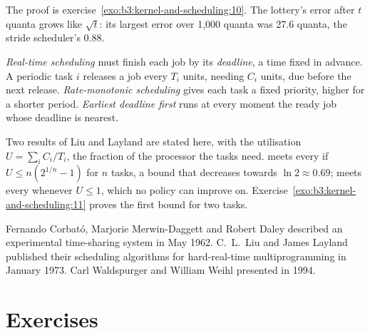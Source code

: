 The proof is exercise~\ref{exo:b3:kernel-and-scheduling:10}. The lottery's error after $t$ quanta grows like $\sqrt{t}$: its largest error over 1,000 quanta was 27.6 quanta, the stride scheduler's 0.88.

\begin{definition}\label{def:b3:kernel-and-scheduling:realtime}
\emph{Real-time scheduling} must finish each job by its \emph{deadline}, a time fixed in advance. A periodic task $i$ releases a job every $T_i$ units, needing $C_i$ units, due before the next release. \emph{Rate-monotonic scheduling} gives each task a fixed priority, higher for a shorter period. \emph{Earliest deadline first} runs at every moment the ready job whose deadline is nearest.
\end{definition}

Two results of Liu and Layland are stated here, with the utilisation $U = \sum_i C_i / T_i$, the fraction of the processor the tasks need.  meets every  if $U \le n(2^{1/n} - 1)$ for $n$ tasks, a bound that decreases towards $\ln 2 \approx 0.69$;  meets every  whenever $U \le 1$, which no policy can improve on. %
Exercise~\ref{exo:b3:kernel-and-scheduling:11} proves the first bound for two tasks.

\begin{history}[Schedulers]
Fernando Corbató, Marjorie Merwin-Daggett and Robert Daley described an experimental time-sharing system in May 1962. %
C.~L.~Liu and James Layland published their scheduling algorithms for hard-real-time multiprogramming in January 1973. %
Carl Waldspurger and William Weihl presented  in 1994. %
\end{history}

\section{Exercises}\label{sec:b3:kernel-and-scheduling:exercises}

